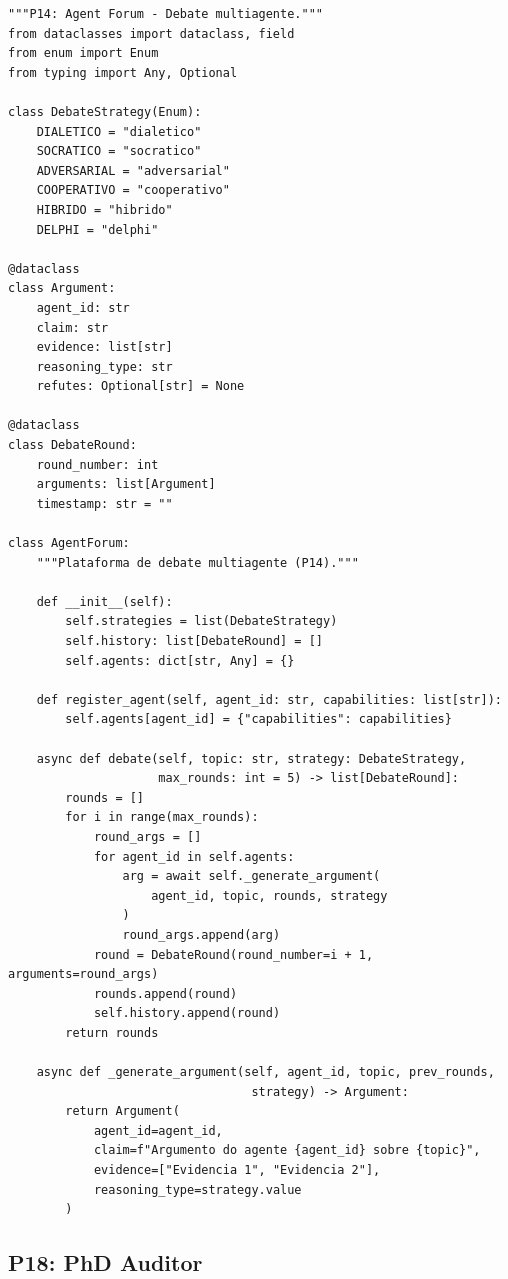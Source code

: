\begin{lstlisting}[style=pythonstyle, caption={Agent Forum --- debate multiagente},
                   label={lst:agent-forum}]
"""P14: Agent Forum - Debate multiagente."""
from dataclasses import dataclass, field
from enum import Enum
from typing import Any, Optional

class DebateStrategy(Enum):
    DIALETICO = "dialetico"
    SOCRATICO = "socratico"
    ADVERSARIAL = "adversarial"
    COOPERATIVO = "cooperativo"
    HIBRIDO = "hibrido"
    DELPHI = "delphi"

@dataclass
class Argument:
    agent_id: str
    claim: str
    evidence: list[str]
    reasoning_type: str
    refutes: Optional[str] = None

@dataclass
class DebateRound:
    round_number: int
    arguments: list[Argument]
    timestamp: str = ""

class AgentForum:
    """Plataforma de debate multiagente (P14)."""

    def __init__(self):
        self.strategies = list(DebateStrategy)
        self.history: list[DebateRound] = []
        self.agents: dict[str, Any] = {}

    def register_agent(self, agent_id: str, capabilities: list[str]):
        self.agents[agent_id] = {"capabilities": capabilities}

    async def debate(self, topic: str, strategy: DebateStrategy,
                     max_rounds: int = 5) -> list[DebateRound]:
        rounds = []
        for i in range(max_rounds):
            round_args = []
            for agent_id in self.agents:
                arg = await self._generate_argument(
                    agent_id, topic, rounds, strategy
                )
                round_args.append(arg)
            round = DebateRound(round_number=i + 1, arguments=round_args)
            rounds.append(round)
            self.history.append(round)
        return rounds

    async def _generate_argument(self, agent_id, topic, prev_rounds,
                                  strategy) -> Argument:
        return Argument(
            agent_id=agent_id,
            claim=f"Argumento do agente {agent_id} sobre {topic}",
            evidence=["Evidencia 1", "Evidencia 2"],
            reasoning_type=strategy.value
        )
\end{lstlisting}

\subsection{P18: PhD Auditor}
\label{subsec:phd-auditor}

